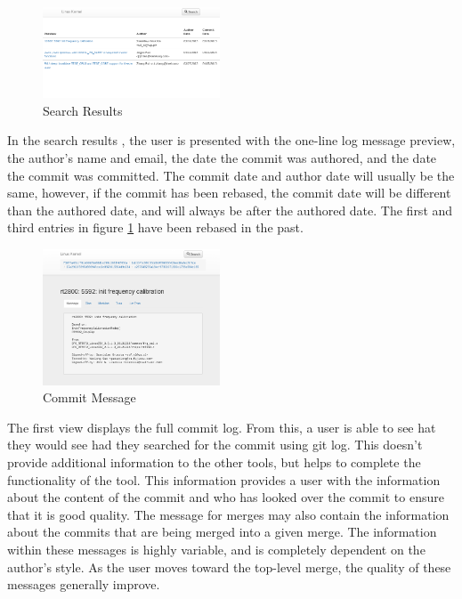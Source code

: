\documentclass[conference, draftclsnofoot]{IEEEtran}
\begin{document}
\begin{figure}[h]
	\centering
	\includegraphics[width=0.47\textwidth]{figures/search_results.png}
	\caption{Search Results}
	\label{fig:results}
\end{figure}

In the search results , the user is presented with the one-line log message
preview, the author's name and email, the date the commit was authored, and the
date the commit was committed. 
The commit date and author date will usually be the same, however, if the
commit has been rebased, the commit date will be different than the authored
date, and will always be after the authored date. The first and third entries
in figure \ref{fig:results} have been rebased in the past. 

\begin{figure}[h]
	\centering
	\includegraphics[width=0.47\textwidth]{figures/message_view.png}
	\caption{Commit Message}
	\label{fig:message}
\end{figure}

The first view displays the full commit log. From this, a user is able to see
hat they would see had they searched for the commit using git log. This doesn't
provide additional information to the other tools, but helps to complete the
functionality of the tool. This information provides a user with the
information about the content of the commit and who has looked over the commit
to ensure that it is good quality. The message for merges may also contain the
information about the commits that are being merged into a given merge. The
information within these messages is highly variable, and is completely
dependent on the author's style. As the user moves toward the top-level merge,
the quality of these messages generally improve.
\end{document}
